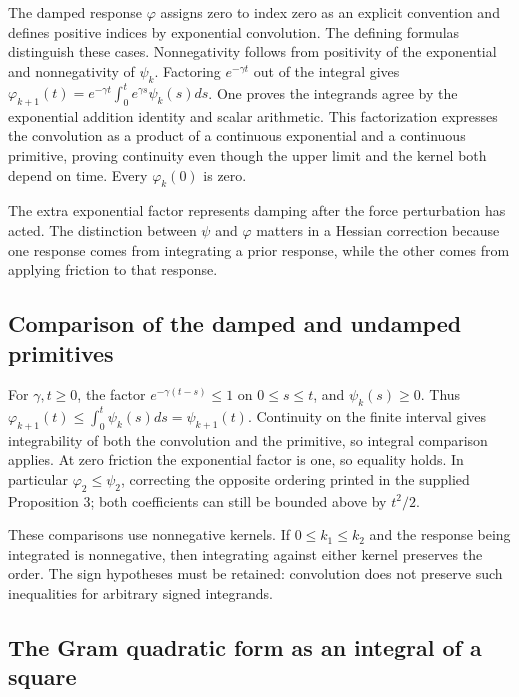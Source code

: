 \documentclass[11pt,a4paper]{report}
\begin{document}
The damped response \(\varphi\) assigns zero to index zero as an explicit convention and defines positive indices by exponential convolution. The defining formulas distinguish these cases. Nonnegativity follows from positivity of the exponential and nonnegativity of \(\psi_k\). Factoring \(e^{-\gamma t}\) out of the integral gives \(\varphi_{k+1}(t)=e^{-\gamma t}\int_0^te^{\gamma s}\psi_k(s)ds\). One proves the integrands agree by the exponential addition identity and scalar arithmetic. This factorization expresses the convolution as a product of a continuous exponential and a continuous primitive, proving continuity even though the upper limit and the kernel both depend on time. Every \(\varphi_k(0)\) is zero.



The extra exponential factor represents damping after the force perturbation has acted. The distinction between \(\psi\) and \(\varphi\) matters in a Hessian correction because one response comes from integrating a prior response, while the other comes from applying friction to that response.

\subsection{\texorpdfstring{Comparison of the damped and undamped primitives}{Comparison of the damped and undamped primitives}}
\label{report-step-KineticLangevin-Coefficients-lean-7}


For \(\gamma,t\ge0\), the factor \(e^{-\gamma(t-s)}\le1\) on \(0\le s\le t\), and \(\psi_k(s)\ge0\). Thus \(\varphi_{k+1}(t)\le\int_0^t\psi_k(s)ds=\psi_{k+1}(t)\). Continuity on the finite interval gives integrability of both the convolution and the primitive, so integral comparison applies. At zero friction the exponential factor is one, so equality holds. In particular \(\varphi_2\le\psi_2\), correcting the opposite ordering printed in the supplied Proposition 3; both coefficients can still be bounded above by \(t^2/2\).



These comparisons use nonnegative kernels. If \(0\le k_1\le k_2\) and the response being integrated is nonnegative, then integrating against either kernel preserves the order. The sign hypotheses must be retained: convolution does not preserve such inequalities for arbitrary signed integrands.

\subsection{\texorpdfstring{The Gram quadratic form as an integral of a square}{The Gram quadratic form as an integral of a square}}
\label{report-step-KineticLangevin-Coefficients-lean-8}
\end{document}
